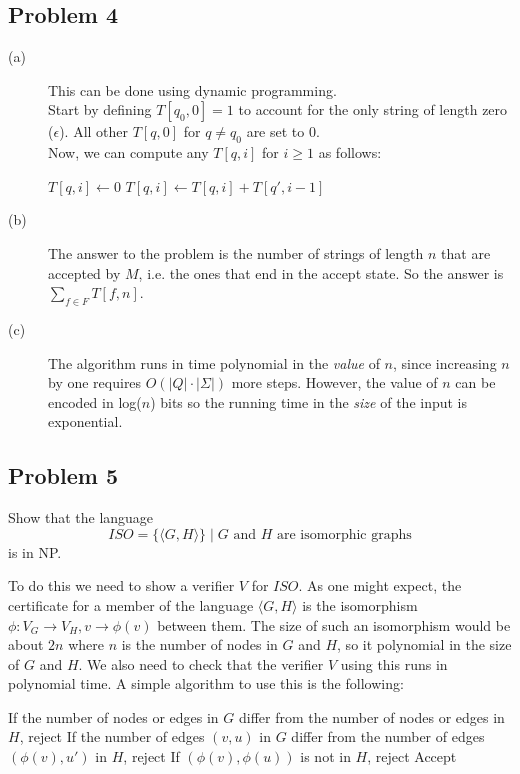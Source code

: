 \documentclass[english]{article}
\begin{document}
\subsection*{Problem 4}
\begin{description}
	\item[(a)] This can be done using dynamic programming.\\
	Start by defining $T[q_0,0] = 1$ to account for the only string of length zero ($\epsilon$).
	All other $T[q,0]$ for $q \ne q_0$ are set to 0.\\
	Now, we can compute any $T[q,i]$ for $i \ge 1$ as follows:
	\begin{algorithmic}
		\State $T[q,i] \gets 0$
				\State $T[q,i] \gets T[q,i] + T[q',i-1]$
			\EndIf
			\EndFor
		\EndFor
	\end{algorithmic}
	
	\item[(b)] The answer to the problem is the number of strings of length $n$ that are accepted
	by $M$, i.e. the ones that end in the accept state. So the answer is $\sum_{f \in F}T[f,n]$.
	
	\item[(c)] The algorithm runs in time polynomial in the \emph{value} of $n$, since increasing
	$n$ by one requires $O(|Q| \cdot |\Sigma|)$ more steps. However, the value of $n$ can be
	encoded in log($n$) bits so the running time in the \emph{size} of the input is exponential.
\end{description}

\subsection*{Problem 5}
Show that the language
\[ ISO = \{ \langle G, H \rangle \} \mid
		\textrm{$G$ and $H$ are isomorphic graphs} \]
is in NP.

To do this we need to show a verifier $V$ for $ISO$. As one might expect, the
certificate for a member of the language $\langle G, H \rangle$ is the
isomorphism $\phi: V_G \rightarrow V_H, v \rightarrow \phi(v)$ between them.
The size of such an isomorphism would be about $2n$ where $n$ is the number of
nodes in $G$ and $H$, so it polynomial in the size of $G$ and $H$. 
We also need to check that the verifier $V$ using this runs in polynomial
time. A simple algorithm to use this is the following:

\begin{algorithmic}
\State If the number of nodes or edges in $G$ differ from the number of nodes
		or edges in $H$, reject
	\State If the number of edges $(v,u)$ in $G$ differ from the number of
			edges $(\phi(v),u')$ in $H$, reject
	\For{Edges $(v,u)$ in $G$}
		\State If $(\phi(v),\phi(u))$ is not in $H$, reject
	\EndFor
\EndFor
\State Accept
\EndFunction 
\end{algorithmic}
\end{document}
